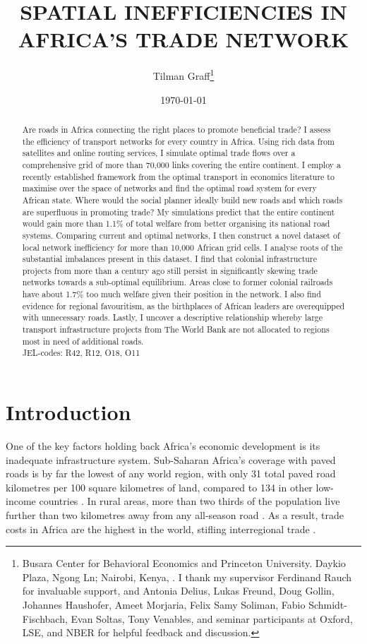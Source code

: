 \documentclass[11pt, oneside]{article}   	%
\title{\MakeUppercase{Spatial Inefficiencies in Africa's Trade Network}}
\author{Tilman Graff\thanks{Busara Center for Behavioral Economics and Princeton University. Daykio Plaza, Ngong Ln; Nairobi, Kenya, \href{mailto:tgraff@princeton.edu}{\UrlFont{tgraff@princeton.edu}}. I thank my supervisor Ferdinand Rauch for invaluable support, and Antonia Delius, Lukas Freund, Doug Gollin, Johannes Haushofer, Ameet Morjaria, Felix Samy Soliman, Fabio Schmidt-Fischbach, Evan Soltas, Tony Venables, and seminar participants at Oxford, LSE, and NBER for helpful feedback and discussion.}}
\date{\today}
\begin{document}


\maketitle

\begin{abstract}
  Are roads in Africa connecting the right places to promote beneficial trade? I assess the efficiency of transport networks for every country in Africa. Using rich data from satellites and online routing services, I simulate optimal trade flows over a comprehensive grid of more than 70,000 links covering the entire continent. I employ a recently established framework from the optimal transport in economics literature to maximise over the space of networks and find the optimal road system for every African state. Where would the social planner ideally build new roads and which roads are superfluous in promoting trade? My simulations predict that the entire continent would gain more than 1.1\% of total welfare from better organising its national road systems. Comparing current and optimal networks, I then construct a novel dataset of local network inefficiency for more than 10,000 African grid cells. I analyse roots of the substantial imbalances present in this dataset. I find that colonial infrastructure projects from more than a century ago still persist in significantly skewing trade networks towards a sub-optimal equilibrium. Areas close to former colonial railroads have about 1.7\% too much welfare given their position in the network. I also find evidence for regional favouritism, as the birthplaces of African leaders are overequipped with unnecessary roads. Lastly, I uncover a descriptive relationship whereby large transport infrastructure projects from The World Bank are not allocated to regions most in need of additional roads.
  \\JEL-codes: R42, R12, O18, O11
\end{abstract}

\newpage



\section{Introduction}
One of the key factors holding back Africa's economic development is its inadequate infrastructure system. Sub-Saharan Africa's coverage with paved roads is by far the lowest of any world region, with only 31 total paved road kilometres per 100 square kilometres of land, compared to 134 in other low-income countries \citep{Foster_AfricaInfrastructureTime_2010}. In rural areas, more than two thirds of the population live further than two kilometres away from any all-season road \citep{Teravaninthorn_TransportPricesCosts_2009}. As a result, trade costs in Africa are the highest in the world, stifling interregional trade \citep{Limao_InfrastructureGeographicalDisadvantage_2001,Foster_AfricaInfrastructureTime_2010,TheEconomist_All_2015}.
\end{document}
